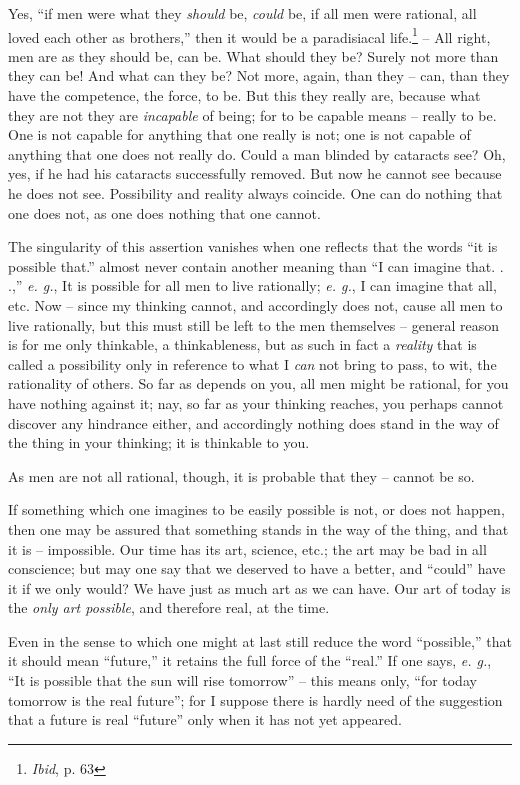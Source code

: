 \documentclass[12pt,a4paper]{book}
\begin{document}
Yes, ``if men were what they \textit{should} be, \textit{could} be, if all 
men were rational, all loved each other as brothers,'' then it would be a 
paradisiacal life.\footnote{\textit{Ibid}, p. 63} -- All right, men are as 
they should be, can be. What should they be? Surely not more than they can be! 
And what can they be? Not more, again, than they -- can, than they have the 
competence, the force, to be. But this they really are, because what they are 
not they are \textit{incapable} of being; for to be capable means -- really to 
be. One is not capable for anything that one really is not; one is not capable 
of anything that one does not really do. Could a man blinded by cataracts see? 
Oh, yes, if he had his cataracts successfully removed. But now he cannot see 
because he does not see. Possibility and reality always coincide. One can do 
nothing that one does not, as one does nothing that one cannot.

The singularity of this assertion vanishes when one reflects that the words 
``it is possible that.'' almost never contain another meaning than ``I can 
imagine that. . .,'' \textit{e. g.}, It is possible for all men to live 
rationally; \textit{e. g.}, I can imagine that all, etc. Now -- since my 
thinking cannot, and accordingly does not, cause all men to live rationally, 
but this must still be left to the men themselves -- general reason is for me 
only thinkable, a thinkableness, but as such in fact a \textit{reality} that 
is called a possibility only in reference to what I \textit{can} not bring to 
pass, to wit, the rationality of others. So far as depends on you, all men 
might be rational, for you have nothing against it; nay, so far as your 
thinking reaches, you perhaps cannot discover any hindrance either, and 
accordingly nothing does stand in the way of the thing in your thinking; it is 
thinkable to you.

As men are not all rational, though, it is probable that they -- cannot be so.

If something which one imagines to be easily possible is not, or does not 
happen, then one may be assured that something stands in the way of the thing, 
and that it is -- impossible. Our time has its art, science, etc.; the art may 
be bad in all conscience; but may one say that we deserved to have a better, 
and ``could'' have it if we only would? We have just as much art as we can 
have. Our art of today is the \textit{only art possible}, and therefore real, 
at the time.

Even in the sense to which one might at last still reduce the word 
``possible,'' that it should mean ``future,'' it retains the full force of 
the ``real.'' If one says, \textit{e. g.}, ``It is possible that the sun 
will rise tomorrow'' -- this means only, ``for today tomorrow is the real 
future''; for I suppose there is hardly need of the suggestion that a future 
is real ``future'' only when it has not yet appeared.
\end{document}
